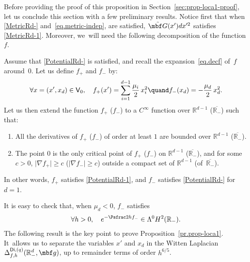 Before providing the proof of this proposition in
Section~\ref{sec:prop-loca1-proof}, let us conclude
this section with a few preliminary results. Notice first that when \ref{MetricRd-} and~\eqref{eq.metric-indep}, are
satisfied, $\tilde{\mbf G}(x') dx'^2$ satisfies
\ref{MetricRd-1}. Moreover, we~will need the following decomposition of the
function $f$.

\begin{definition}\label{de.pre1}
Assume that \ref{PotentialRd-} is satisfied, and recall the
expansion~\eqref{eq.decf} of~$f$ around~$0$.
Let us define $f_+$ and $f_-$ by:
\begin{equation}\label{eq.plusmoins}
\forall x=(x',x_d)\in \mathsf V_0,\quad f_+(x')= \sum_{i=1}^{ d-1}\frac{\mu_i}{2} \, x_i^2 \quand f_-(x_d)=-\frac{\mu_{d}}{2}\, x_d^2.
\end{equation}
Let us then extend the function $f_+$ (\resp $f_-$) to a $C^\infty$
function over $ {\mathbb R^{d-1}}$ (\resp $\overline{\mathbb R_-}$)
such that:
\begin{enumerate}
\item\label{de.pre11}
All the derivatives of $f_+$ (\resp $f_-$) of order at least $1$
are bounded over $ {\mathbb R^{d-1}}$ (\resp $\overline{\mathbb R_-}$).
\item\label{de.pre12}
The point $0$ is the only critical point of $f_+$ (\resp $f_-$) on $ {\mathbb R^{d-1}}$ (\resp $\overline{\mathbb R_-}$), and for some $c>0$, $\vert \nabla f_+\vert \ge c$ (\resp $\vert \nabla f_-\vert \ge c$) outside a compact set of $ {\mathbb R^{d-1}}$ (\resp of~$\overline{\mathbb R_-}$).
\end{enumerate}
In other words, $f_+$ satisfies \ref{PotentialRd-1}, and $f_-$ satisfies \ref{PotentialRd-} for $d=1$.
\end{definition}

It is easy to check that, when $\mu_{d}<0$, $f_-$ satisfies
\begin{equation}\label{eq.f-ext}
\forall h>0,\quad e^{-\Psfrac 2h f_-}\in \Lambda^0H^2(\mathbb R_-).
\end{equation}
The following result is the key point to prove Proposition~\ref{pr.prop-loca1}. It~allows us to separate the variables $x'$ and $x_d$ in the Witten
Laplacian $\Delta_{f,h}^{\mathsf{Di},(q)}(\mathbb R^d_-, \mbf g)$, up
to remainder terms of order $h^{6/5}$.

